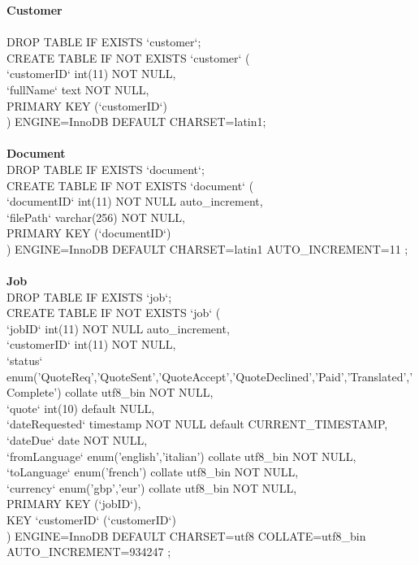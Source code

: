 \documentclass{l3proj}
\begin{document}
\small{
\textbf{Customer}\\
\\
DROP TABLE IF EXISTS `customer`;\\
CREATE TABLE IF NOT EXISTS `customer` (\\
  `customerID` int(11) NOT NULL,\\
  `fullName` text NOT NULL,\\
  PRIMARY KEY  (`customerID`)\\
) ENGINE=InnoDB DEFAULT CHARSET=latin1;\\
\\
\textbf{Document}
\\
DROP TABLE IF EXISTS `document`; \\
CREATE TABLE IF NOT EXISTS `document` ( \\
  `documentID` int(11) NOT NULL auto\_increment, \\
  `filePath` varchar(256) NOT NULL, \\
  PRIMARY KEY  (`documentID`) \\
) ENGINE=InnoDB  DEFAULT CHARSET=latin1 AUTO\_INCREMENT=11 ;\\
\\
\textbf{Job}
\\
DROP TABLE IF EXISTS `job`;\\
CREATE TABLE IF NOT EXISTS `job` (\\
  `jobID` int(11) NOT NULL auto\_increment,\\
  `customerID` int(11) NOT NULL,\\
  `status` enum('QuoteReq','QuoteSent','QuoteAccept','QuoteDeclined','Paid','Translated','Complete') collate utf8\_bin NOT NULL,\\
  `quote` int(10) default NULL,\\
  `dateRequested` timestamp NOT NULL default CURRENT\_TIMESTAMP,\\
  `dateDue` date NOT NULL,\\
  `fromLanguage` enum('english','italian') collate utf8\_bin NOT NULL,\\
  `toLanguage` enum('french') collate utf8\_bin NOT NULL,\\
  `currency` enum('gbp','eur') collate utf8\_bin NOT NULL,\\
  PRIMARY KEY  (`jobID`),\\
  KEY `customerID` (`customerID`)\\
) ENGINE=InnoDB  DEFAULT CHARSET=utf8 COLLATE=utf8\_bin AUTO\_INCREMENT=934247 ;\\
\\
}
\end{document}
